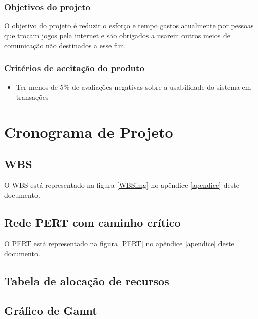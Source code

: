 \documentclass[a4paper,11pt]{article}
\begin{document}
		\subsubsection{Objetivos do projeto}
			O objetivo do projeto é reduzir o esforço e tempo gastos atualmente por pessoas que trocam jogos pela internet e são obrigados a usarem outros meios de comunicação não destinados a esse fim.
			
		\subsubsection{Critérios de aceitação do produto}
			\begin{itemize}
				\item Ter menos de 5\% de avaliações negativas sobre a usabilidade do sistema em transações
			\end{itemize}
	
\section{Cronograma de Projeto}
	\subsection{WBS}
    	O WBS está representado na figura \ref{WBSimg} no apêndice \ref{apendice} deste documento.

	\subsection{Rede PERT com caminho crítico}
		O PERT está representado na figura \ref{PERT} no apêndice \ref{apendice} deste documento.
	\subsection{Tabela de alocação de recursos}
	\subsection{Gráfico de Gannt}
	
\end{document}
